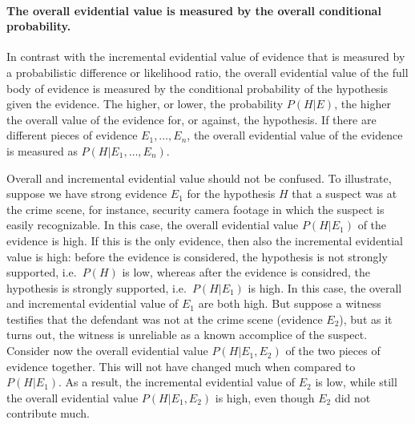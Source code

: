 \documentclass[10pt]{article}
\begin{document}


\paragraph{The overall evidential value is measured by the overall conditional probability. }

In contrast with the incremental evidential value of evidence that is measured by a probabilistic difference or likelihood ratio, the overall evidential value of the full body of evidence is measured by the conditional probability 
of the hypothesis given the evidence. The higher, or lower, the probability $P(H|E)$, the higher 
the overall value of the evidence for, or against, the hypothesis. If there are different pieces of evidence $E_1, \ldots, E_n$, the overall evidential value of the evidence is measured as $P(H|E_1, \ldots, E_n)$.

Overall and incremental evidential value should not be confused. To illustrate, suppose we have strong evidence $E_1$ for the hypothesis $H$ 
that a suspect was at the crime scene, for instance, security camera footage in which the suspect is easily recognizable. 
In this case, the overall evidential value $P(H|E_1)$ of the evidence is high. If this is the only evidence, then also the 
incremental evidential value is high: before the evidence is considered, the hypothesis is not strongly supported, i.e.\ $P(H)$ is low, whereas after the evidence is considred, 
the hypothesis is strongly supported, i.e.\ $P(H|E_1)$ is high. In this case, the overall and incremental evidential value of $E_1$ are both high. 
But suppose a witness testifies that the defendant was not at the crime scene (evidence $E_2$), but as it turns out, the witness is unreliable 
as a known accomplice of the suspect. Consider now the overall evidential value $P(H|E_1, E_2)$ of the two pieces of evidence together. This will not have changed much when compared to $P(H|E_1)$. As a result, the incremental evidential value of $E_2$ is low, while still the overall evidential value $P(H|E_1, E_2)$ is high, even though $E_2$ did not contribute much. 
\end{document}
